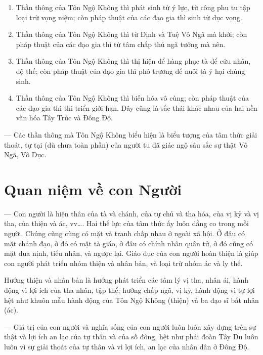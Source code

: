 \begin{enumerate}[label=\itshape\alph*\upshape/]
    \item Thần thông của Tôn Ngộ Không thì phát sinh từ ý lực, từ công phu tu tập loại trừ vọng niệm; còn pháp thuật của các đạo gia thì sinh từ dục vọng.

    \item Thần thông của Tôn Ngộ Không thì từ Định và Tuệ Vô Ngã mà khởi; còn pháp thuật của các đạo gia thì từ tâm chấp thủ ngã tướng mà nên.

    \item Thần thông của Tôn Ngộ Không thì thị hiện để hàng phục tà để cứu nhân, độ thế; còn pháp thuật của đạo gia thì phô trương để nuôi tà ý hại chúng sinh.

    \item Thần thông của Tôn Ngộ Không thì biến hóa vô cùng; còn pháp thuật của các đạo gia thì thi triển giới hạn. Đây cũng là sắc thái khác nhau của hai nền văn hóa Tây Trúc và Đông Độ.
\end{enumerate}

--- Các thần thông mà Tôn Ngộ Không biểu hiện là biểu tượng của tâm thức giải thoát, tự tại (dù chưa toàn phần) của người tu đã giác ngộ sâu sắc sự thật Vô Ngã, Vô Dục.


\section{Quan niệm về con Người} %
\label{sec:44_45_con_nguoi}

--- Con người là hiện thân của tà và chánh, của tự chủ và tha hóa, của vị kỷ và vị tha, của thiện và ác, vv\ldots. Hai thế lực của tâm thức ấy luôn dằng co trong mỗi người. Chúng cũng cùng có mặt và tranh chấp nhau ở ngoài xã hội. Ở đâu có mặt chánh đạo, ở đó có mặt tà giáo, ở đâu có chính nhân quân tử, ở đó cũng có mặt dua nịnh, tiểu nhân, và ngược lại. Giáo dục của con người hoàn thiện là giúp con người phát triển nhóm thiện và nhân bản, và loại trừ nhóm ác và ly thể.

Hướng thiện và nhân bản là hướng phát triển các tâm lý vị tha, nhân ái, hành động vì lợi ích của tha nhân, tập thể; hướng chấp ngã, vị kỷ, hành động vì tự lợi hệt như khuôn mẫu hành động của Tôn Ngộ Không (thiện) và ba đạo sĩ bất nhân (ác).

--- Giá trị của con người và nghĩa sống của con người luôn luôn xây dựng trên sự thật và lợi ích an lạc của tự thân và của số đông, hệt như phái đoàn Tây Du luôn luôn vì sự giải thoát của tự thân và vì lợi ích, an lạc của nhân dân ở Đông Độ.

